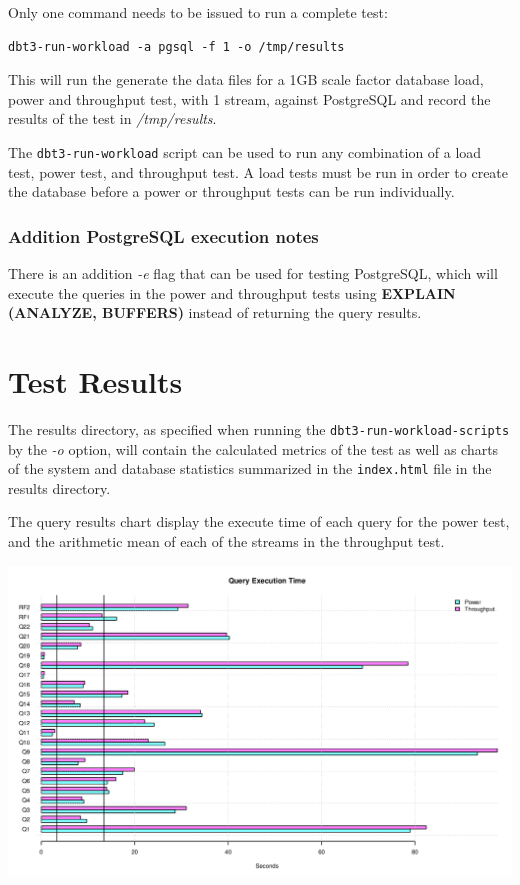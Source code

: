 \documentclass{article}
\begin{document}
Only one command needs to be issued to run a complete test:
\lstset{language=sh}
\begin{lstlisting}
dbt3-run-workload -a pgsql -f 1 -o /tmp/results
\end{lstlisting}

This will run the generate the data files for a 1GB scale factor database load, power and throughput test, with 1 stream, against PostgreSQL and record the results of the test in \textit{/tmp/results}.

The \texttt{dbt3-run-workload} script can be used to run any combination of a load test, power test, and throughput test.  A load tests must be run in order to create the database before a power or throughput tests can be run individually.

\subsubsection{Addition PostgreSQL execution notes}

There is an addition \textit{-e} flag that can be used for testing PostgreSQL, which will execute the queries in the power and throughput tests using \textbf{EXPLAIN (ANALYZE, BUFFERS)} instead of returning the query results.

\section{Test Results}

The results directory, as specified when running the \texttt{dbt3-run-workload-scripts} by the \textit{-o} option, will contain the calculated metrics of the test as well as charts of the system and database statistics summarized in the \texttt{index.html} file in the results directory.

The query results chart display the execute time of each query for the power test, and the arithmetic mean of each of the streams in the throughput test.

\begin{center}
\includegraphics[scale=0.5]{q_time.png}
\end{center}
\end{document}
